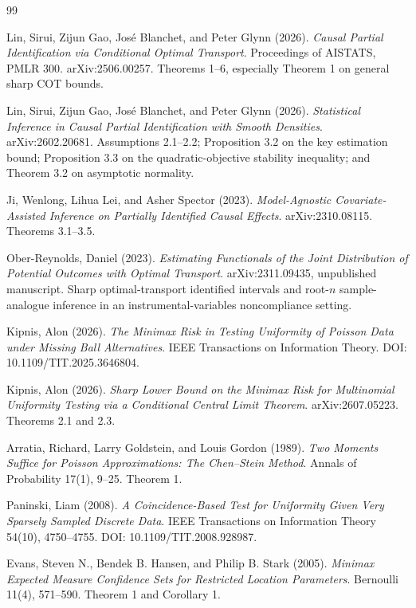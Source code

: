 \documentclass{article}
\begin{document}
\begin{thebibliography}{99}

   Lin, Sirui, Zijun Gao, José Blanchet, and Peter Glynn (2026). \emph{Causal Partial Identification via Conditional Optimal Transport}. Proceedings of AISTATS, PMLR 300. arXiv:2506.00257. Theorems 1--6, especially Theorem 1 on general sharp COT bounds.

   Lin, Sirui, Zijun Gao, José Blanchet, and Peter Glynn (2026). \emph{Statistical Inference in Causal Partial Identification with Smooth Densities}. arXiv:2602.20681. Assumptions 2.1--2.2; Proposition 3.2 on the key estimation bound; Proposition 3.3 on the quadratic-objective stability inequality; and Theorem 3.2 on asymptotic normality.

   Ji, Wenlong, Lihua Lei, and Asher Spector (2023). \emph{Model-Agnostic Covariate-Assisted Inference on Partially Identified Causal Effects}. arXiv:2310.08115. Theorems 3.1--3.5.

   Ober-Reynolds, Daniel (2023). \emph{Estimating Functionals of the Joint Distribution of Potential Outcomes with Optimal Transport}. arXiv:2311.09435, unpublished manuscript. Sharp optimal-transport identified intervals and root-\(n\) sample-analogue inference in an instrumental-variables noncompliance setting.

   Kipnis, Alon (2026). \emph{The Minimax Risk in Testing Uniformity of Poisson Data under Missing Ball Alternatives}. IEEE Transactions on Information Theory. DOI: 10.1109/TIT.2025.3646804.

   Kipnis, Alon (2026). \emph{Sharp Lower Bound on the Minimax Risk for Multinomial Uniformity Testing via a Conditional Central Limit Theorem}. arXiv:2607.05223. Theorems 2.1 and 2.3.

   Arratia, Richard, Larry Goldstein, and Louis Gordon (1989). \emph{Two Moments Suffice for Poisson Approximations: The Chen--Stein Method}. Annals of Probability 17(1), 9--25. Theorem 1.

   Paninski, Liam (2008). \emph{A Coincidence-Based Test for Uniformity Given Very Sparsely Sampled Discrete Data}. IEEE Transactions on Information Theory 54(10), 4750--4755. DOI: 10.1109/TIT.2008.928987.

   Evans, Steven N., Bendek B. Hansen, and Philip B. Stark (2005). \emph{Minimax Expected Measure Confidence Sets for Restricted Location Parameters}. Bernoulli 11(4), 571--590. Theorem 1 and Corollary 1.


\end{thebibliography}
\end{document}
